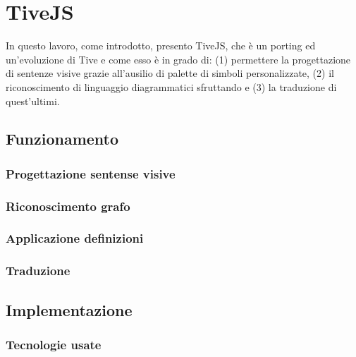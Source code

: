 \chapter{TiveJS}
    In questo lavoro, come introdotto, presento TiveJS, che è un porting ed un'evoluzione di Tive e come esso è in grado di: (1) permettere la progettazione di sentenze visive grazie all'ausilio di palette di simboli personalizzate, (2) il riconoscimento di linguaggio diagrammatici sfruttando e (3) la traduzione di quest'ultimi.
    \section{Funzionamento}
        \subsection{Progettazione sentense visive}
        \subsection{Riconoscimento grafo}
        \subsection{Applicazione definizioni}
        \subsection{Traduzione}
    \section{Implementazione}
        \subsection{Tecnologie usate}